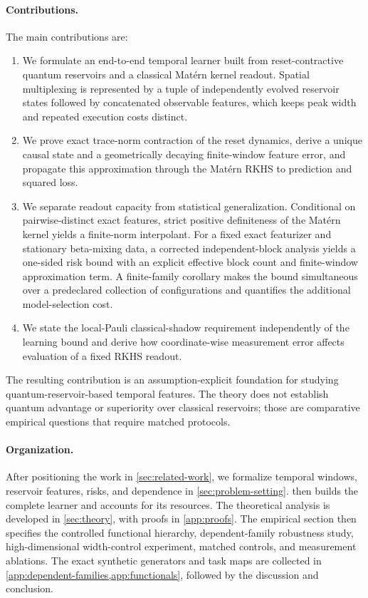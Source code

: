 \paragraph{Contributions.}
The main contributions are:
\begin{enumerate}
    \item We formulate an end-to-end temporal learner built from
    reset-contractive quantum reservoirs and a classical Mat\'ern kernel
    readout. Spatial multiplexing is represented by a tuple of independently
    evolved reservoir states followed by concatenated observable features,
    which keeps peak width and repeated execution costs distinct.

    \item We prove exact trace-norm contraction of the reset dynamics, derive a
    unique causal state and a geometrically decaying finite-window feature
    error, and propagate this approximation through the Mat\'ern RKHS to
    prediction and squared loss.

    \item We separate readout capacity from statistical generalization.
    Conditional on pairwise-distinct exact features, strict positive
    definiteness of the Mat\'ern kernel yields a finite-norm interpolant. For a
    fixed exact featurizer and stationary beta-mixing data, a corrected
    independent-block analysis yields a one-sided risk bound with an explicit
    effective block count and finite-window approximation term. A finite-family
    corollary makes the bound simultaneous over a predeclared collection of
    configurations and quantifies the additional model-selection cost.

    \item We state the local-Pauli classical-shadow requirement independently
    of the learning bound and derive how coordinate-wise measurement error
    affects evaluation of a fixed RKHS readout.
\end{enumerate}

The resulting contribution is an assumption-explicit foundation for studying
quantum-reservoir-based temporal features. The theory does not establish
quantum advantage or superiority over classical reservoirs; those are
comparative empirical questions that require matched protocols.

\paragraph{Organization.}
After positioning the work in \cref{sec:related-work}, we formalize temporal
windows, reservoir features, risks, and dependence in
\cref{sec:problem-setting}.  then builds the complete learner
and accounts for its resources. The theoretical analysis is developed in
\cref{sec:theory}, with proofs in \cref{app:proofs}.  The empirical section
then specifies the controlled functional hierarchy, dependent-family
robustness study, high-dimensional width-control experiment, matched controls,
and measurement ablations.  The exact synthetic generators and task maps are
collected in \cref{app:dependent-families,app:functionals}, followed by the
discussion and conclusion.
